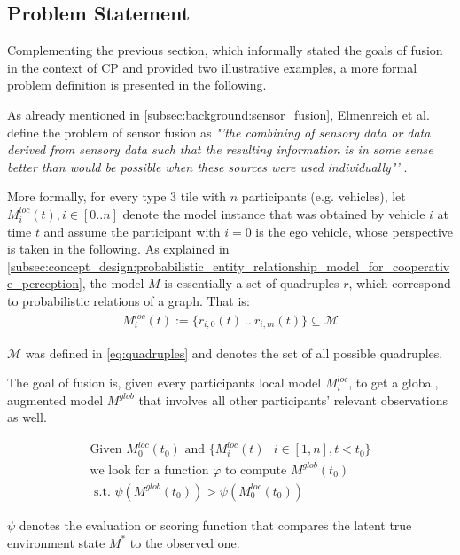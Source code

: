 \subsection{Problem Statement}
\label{subsec:concept_design:fusion_problem_statement}
Complementing the previous section, which informally stated the goals of fusion in the context of CP and provided two illustrative examples, a more formal problem definition is presented in the following.

As already mentioned in \cref{subsec:background:sensor_fusion}, Elmenreich et al. define the problem of sensor fusion as \textit{"'the combining of sensory data or data derived from sensory data such that the resulting information is in some sense better than would be possible when these sources were used individually"'} \cite{Elmenreich2002}.
\par
\bigskip

More formally, for every type 3 tile with $n$ participants (e.g. vehicles), let $M^{loc}_i(t), i \in [0..n]$ denote the model instance that was obtained by vehicle $i$ at time $t$ and assume the participant with $i = 0$ is the ego vehicle, whose perspective is taken in the following. As explained in \cref{subsec:concept_design:probabilistic_entity_relationship_model_for_cooperative_perception}, the model $M$ is essentially a set of quadruples $r$, which correspond to probabilistic relations of a graph. That is:
\begin{gather*}
	M^{loc}_i(t) := \{r_{i,0}(t) \ .. \ r_{i,m}(t)\} \subseteq \mathcal{M}
\end{gather*}

$\mathcal{M}$ was defined in \cref{eq:quadruples} and denotes the set of all possible quadruples.
\par
\medspace

The goal of fusion is, given every participants local model $M^{loc}_i$, to get a global, augmented model $M^{glob}$ that involves all other participants' relevant observations as well.

\begin{gather*}
	\text{Given\ } M^{loc}_0(t_0) \text{\ and\ } \{M^{loc}_i(t)\ |\ i \in [1, n], t < t_0\} \\
	\text{we look for a function\ } \varphi \text{\ to compute\ } M^{glob}(t_0) \\ 
	\text{\ s.t.\ } \psi(M^{glob}(t_0)) > \psi(M^{loc}_0(t_0))
\end{gather*}

$\psi$ denotes the evaluation or scoring function that compares the latent true environment state $M^*$ to the observed one.

